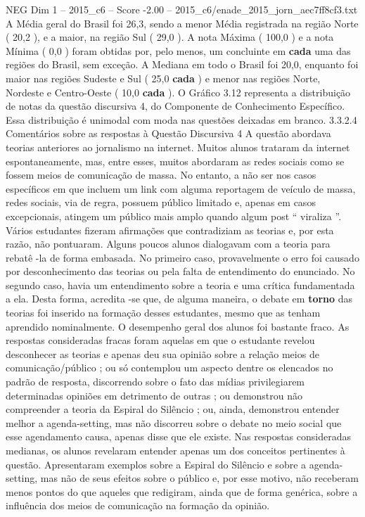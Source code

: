 \begin{textsample}{NEG Dim 1 – 2015\_c6 – Score -2.00 – 2015\_c6/enade\_2015\_jorn\_aec7ff8cf3.txt}
A Média geral do Brasil foi 26,3, sendo a menor Média registrada na região Norte ( 20,2 ), e a maior, na região Sul ( 29,0 ).
A nota Máxima ( 100,0 ) e a nota Mínima ( 0,0 ) foram obtidas por, pelo menos, um concluinte em \textbf{cada} uma das regiões do Brasil, sem exceção.
A Mediana em todo o Brasil foi 20,0, enquanto foi maior nas regiões Sudeste e Sul ( 25,0 \textbf{cada} ) e menor nas regiões Norte, Nordeste e Centro-Oeste ( 10,0 \textbf{cada} ).
O Gráfico 3.12 representa a distribuição de notas da questão discursiva 4, do Componente de Conhecimento Específico.
Essa distribuição é unimodal com moda nas questões deixadas em branco. 3.3.2.4 Comentários sobre as respostas à Questão Discursiva 4 A questão abordava teorias anteriores ao jornalismo na internet.
Muitos alunos trataram da internet espontaneamente, mas, entre esses, muitos abordaram as redes sociais como se fossem meios de comunicação de massa.
No entanto, a não ser nos casos específicos em que incluem um link com alguma reportagem de veículo de massa, redes sociais, via de regra, possuem público limitado e, apenas em casos excepcionais, atingem um público mais amplo quando algum post “ viraliza ”.
Vários estudantes fizeram afirmações que contradiziam as teorias e, por esta razão, não pontuaram.
Alguns poucos alunos dialogavam com a teoria para rebatê -la de forma embasada.
No primeiro caso, provavelmente o erro foi causado por desconhecimento das teorias ou pela falta de entendimento do enunciado.
No segundo caso, havia um entendimento sobre a teoria e uma crítica fundamentada a ela.
Desta forma, acredita -se que, de alguma maneira, o debate em \textbf{torno} das teorias foi inserido na formação desses estudantes, mesmo que as tenham aprendido nominalmente.
O desempenho geral dos alunos foi bastante fraco.
As respostas consideradas fracas foram aquelas em que o estudante revelou desconhecer as teorias e apenas deu sua opinião sobre a relação meios de comunicação/público ; ou só contemplou um aspecto dentre os elencados no padrão de resposta, discorrendo sobre o fato das mídias privilegiarem determinadas opiniões em detrimento de outras ; ou demonstrou não compreender a teoria da Espiral do Silêncio ; ou, ainda, demonstrou entender melhor a agenda-setting, mas não discorreu sobre o debate no meio social que esse agendamento causa, apenas disse que ele existe.
Nas respostas consideradas medianas, os alunos revelaram entender apenas um dos conceitos pertinentes à questão.
Apresentaram exemplos sobre a Espiral do Silêncio e sobre a agenda-setting, mas não de seus efeitos sobre o público e, por esse motivo, não receberam menos pontos do que aqueles que redigiram, ainda que de forma genérica, sobre a influência dos meios de comunicação na formação da opinião.

\end{textsample}
